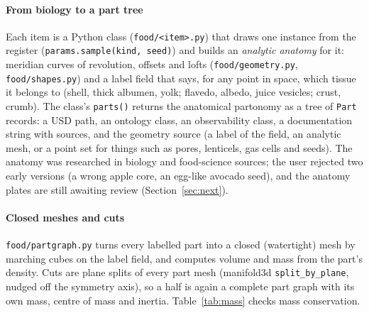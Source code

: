 \documentclass[10.5pt,a4paper]{article}
\begin{document}
\paragraph{From biology to a part tree} Each item is a Python class (\texttt{food/<item>.py}) that draws one instance
from the register (\texttt{params.sample(kind, seed)}) and builds an \emph{analytic anatomy} for it: meridian curves
of revolution, offsets and lofts (\texttt{food/geometry.py}, \texttt{food/shapes.py}) and a label field that says, for
any point in space, which tissue it belongs to (shell, thick albumen, yolk; flavedo, albedo, juice vesicles; crust,
crumb). The class's \texttt{parts()} returns the anatomical partonomy as a tree of \texttt{Part} records: a USD path,
an ontology class, an observability class, a documentation string with sources, and the geometry source (a label of
the field, an analytic mesh, or a point set for things such as pores, lenticels, gas cells and seeds). The anatomy was
researched in biology and food-science sources; the user rejected two early versions (a wrong apple core, an egg-like
avocado seed), and the anatomy plates are still awaiting review (Section~\ref{sec:next}).

\paragraph{Closed meshes and cuts} \texttt{food/partgraph.py} turns every labelled part into a closed (watertight)
mesh by marching cubes on the label field, and computes volume and mass from the part's density. Cuts are plane
splits of every part mesh (manifold3d \texttt{split\_by\_plane}, nudged off the symmetry axis), so a half is again a
complete part graph with its own mass, centre of mass and inertia. Table~\ref{tab:mass} checks mass conservation.
\end{document}
